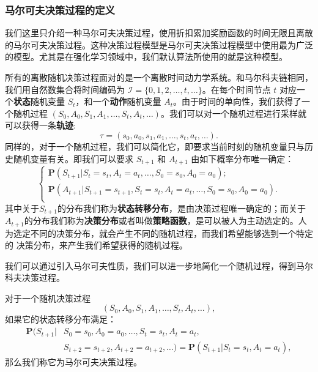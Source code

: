 \subsubsection{马尔可夫决策过程的定义}

我们这里只介绍一种马尔可夫决策过程，使用折扣累加奖励函数的时间无限且离散的马尔可夫决策过程。这种决策过程模型是马尔可夫决策过程模型中使用最为广泛的模型。尤其是在强化学习领域中，我们默认算法所使用的就是这种模型。

所有的离散随机决策过程面对的是一个离散时间动力学系统。和马尔科夫链相同，我们用自然数集合将时间编码为 $\mathcal{I} = \{0, 1, 2, \ldots, t, \ldots\}$。在每个时间节点 $t$ 对应一个\textbf{状态}随机变量 $S_t$，和一个\textbf{动作}随机变量 $A_t$。由于时间的单向性，我们获得了一个随机过程 $(S_0, A_0, S_1, A_1, \ldots, S_t, A_t,\ldots)$。我们可以对一个随机过程进行采样就可以获得一条\textbf{轨迹}:
\begin{equation}
    \tau = (s_0, a_0, s_1, a_1, \ldots, s_t, a_t, \ldots).
\end{equation}
同样的，对于一个随机过程，我们可以简化它，即要求当前时刻的随机变量只与历史随机变量有关。即我们可以要求 $S_{t+1}$ 和 $A_{t+1}$ 由如下概率分布唯一确定：
\begin{equation}
\begin{cases}
    \mathbf{P}(S_{t+1} \vert S_t = s_t,A_t=a_t,\ldots, S_0 = s_0, A_0 = a_0);\\
    \mathbf{P}(A_{t+1} \vert S_{t+1}=s_{t+1},S_t = s_t,A_t=a_t,\ldots,
                                S_0 = s_0, A_0 = a_0).\\
\end{cases}
\end{equation}
其中关于$S_{t+1}$的分布我们称为\textbf{状态转移分布}，是由决策过程唯一确定的；而关于$A_{t+1}$的分布我们称为\textbf{决策分布}或者叫做\textbf{策略函数}，是可以被人为主动选定的。人为选定不同的决策分布，就会产生不同的随机过程，而我们希望能够选到一个特定的
决策分布，来产生我们希望获得的随机过程。

我们可以通过引入马尔可夫性质，我们可以进一步地简化一个随机过程，得到马尔科夫决策过程。
\begin{definition}
    对于一个随机决策过程
    \begin{equation}
        (S_0, A_0, S_1, A_1, \ldots, S_t, A_t,\ldots),
    \end{equation}
    如果它的状态转移分布满足：
    \begin{equation}
        \begin{aligned}
        \mathbf{P}(S_{t+1} \vert &S_0 = s_0, A_0 = a_0,\ldots,S_t = s_t,A_t=a_t,\\
                            &S_{t+2}=s_{t+2}, A_{t+2}=a_{t+2},\ldots)
        = \mathbf{P}(S_{t+1} \vert S_t=s_t, A_t=a_t),
        \end{aligned}
    \end{equation}
    那么我们称它为马尔可夫决策过程。
\end{definition}

